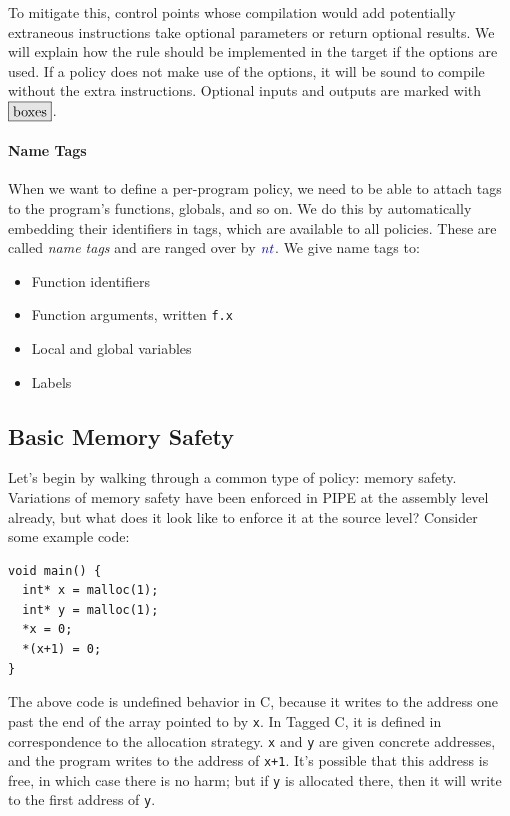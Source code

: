\documentclass[acmsmall,review,anonymous]{acmart}\settopmatter{printfolios=true,printccs=false,printacmref=false}
\begin{document}
To mitigate this, control points whose compilation would add potentially extraneous instructions
take optional parameters or return optional results. We will explain how the rule should be
implemented in the target if the options are used. If a policy does not make use of the options, it will
be sound to compile without the extra instructions. Optional inputs
and outputs are marked with \(\optional{boxes}\).

\paragraph*{Name Tags}

When we want to define a per-program policy, we need to be able to attach tags to the program's
functions, globals, and so on. We do this by automatically embedding their identifiers in tags,
which are available to all policies. These are called {\em name tags} and are ranged over by
\(\mathit{\color{blue} nt}\). We give name tags to:
\begin{itemize}
\item Function identifiers
\item Function arguments, written {\tt f.x}
\item Local and global variables
\item Labels
\end{itemize}

\subsection{Basic Memory Safety}
\label{sec:memsafe}

Let's begin by walking through a common type of policy: memory safety. Variations of memory safety
have been enforced in PIPE at the assembly level already, but what does it look like to enforce it
at the source level? Consider some example code:

\begin{verbatim}
void main() {
  int* x = malloc(1);
  int* y = malloc(1);
  *x = 0;
  *(x+1) = 0;
}
\end{verbatim}

The above code is undefined behavior in C, because it writes to the address one past the end
of the array pointed to by {\tt x}. In Tagged C, it is defined in correspondence to
the allocation strategy. {\tt x} and {\tt y} are given concrete addresses, and the program
writes to the address of {\tt x+1}. It's possible that this address is free, in which case
there is no harm; but if {\tt y} is allocated there, then it will write to the first address
of {\tt y}.
\end{document}
